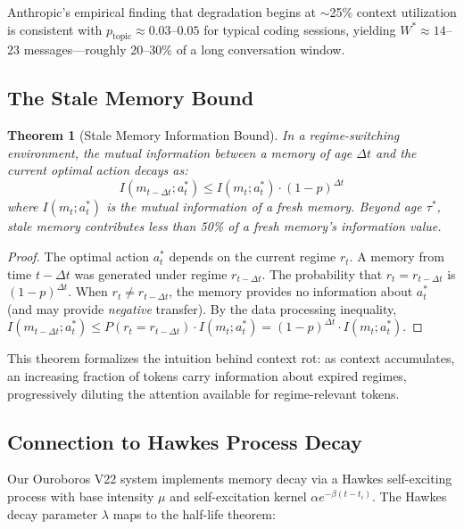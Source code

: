 \documentclass[11pt, a4paper]{article}
\newtheorem{theorem}{Theorem}
\begin{document}
Anthropic's empirical finding that degradation begins at $\sim$25\% context utilization is consistent with $p_{\text{topic}} \approx 0.03$--$0.05$ for typical coding sessions, yielding $W^* \approx 14$--$23$ messages---roughly 20--30\% of a long conversation window.

\subsection{The Stale Memory Bound}

\begin{theorem}[Stale Memory Information Bound]
\label{thm:stale}
In a regime-switching environment, the mutual information between a memory of age $\Delta t$ and the current optimal action decays as:
\begin{equation}
  I(m_{t-\Delta t}; a^*_t) \leq I(m_t; a^*_t) \cdot (1-p)^{\Delta t}
\end{equation}
where $I(m_t; a^*_t)$ is the mutual information of a fresh memory. Beyond age $\tau^*$, stale memory contributes less than 50\% of a fresh memory's information value.
\end{theorem}

\begin{proof}
The optimal action $a^*_t$ depends on the current regime $r_t$. A memory from time $t - \Delta t$ was generated under regime $r_{t-\Delta t}$. The probability that $r_t = r_{t-\Delta t}$ is $(1-p)^{\Delta t}$. When $r_t \neq r_{t-\Delta t}$, the memory provides no information about $a^*_t$ (and may provide \emph{negative} transfer). By the data processing inequality, $I(m_{t-\Delta t}; a^*_t) \leq P(r_t = r_{t-\Delta t}) \cdot I(m_t; a^*_t) = (1-p)^{\Delta t} \cdot I(m_t; a^*_t)$.
\end{proof}

This theorem formalizes the intuition behind context rot: as context accumulates, an increasing fraction of tokens carry information about expired regimes, progressively diluting the attention available for regime-relevant tokens.

\subsection{Connection to Hawkes Process Decay}

Our Ouroboros V22 system implements memory decay via a Hawkes self-exciting process with base intensity $\mu$ and self-excitation kernel $\alpha e^{-\beta(t-t_i)}$. The Hawkes decay parameter $\lambda$ maps to the half-life theorem:
\end{document}
